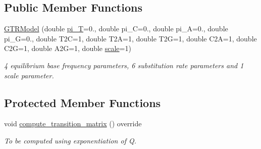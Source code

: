 \subsection*{Public Member Functions}
\begin{DoxyCompactItemize}
\item 
\hyperlink{classretrocombinator_1_1GTRModel_addd67a44caae9a477fc986d287dc2e8e}{G\+T\+R\+Model} (double \hyperlink{classretrocombinator_1_1GTRModel_ab002dbc62f8e8fbfc94558dd94166bd8}{pi\+\_\+T}=0., double pi\+\_\+C=0., double pi\+\_\+A=0., double pi\+\_\+G=0., double T2C=1, double T2A=1, double T2G=1, double C2A=1, double C2G=1, double A2G=1, double \hyperlink{classretrocombinator_1_1PointMutationModel_a3258dfbdae0f2614cdc66f13ae028b46}{scale}=1)
\begin{DoxyCompactList}\small\item\em 4 equilibrium base frequency parameters, 6 substitution rate parameters and 1 scale parameter. \end{DoxyCompactList}\end{DoxyCompactItemize}
\subsection*{Protected Member Functions}
\begin{DoxyCompactItemize}
\item 
\mbox{\label{classretrocombinator_1_1GTRModel_a7d71f990fd33bcb7fc6a74accf03d7ae}} 
void \hyperlink{classretrocombinator_1_1GTRModel_a7d71f990fd33bcb7fc6a74accf03d7ae}{compute\+\_\+transition\+\_\+matrix} () override
\begin{DoxyCompactList}\small\item\em To be computed using exponentiation of Q. \end{DoxyCompactList}\end{DoxyCompactItemize}
